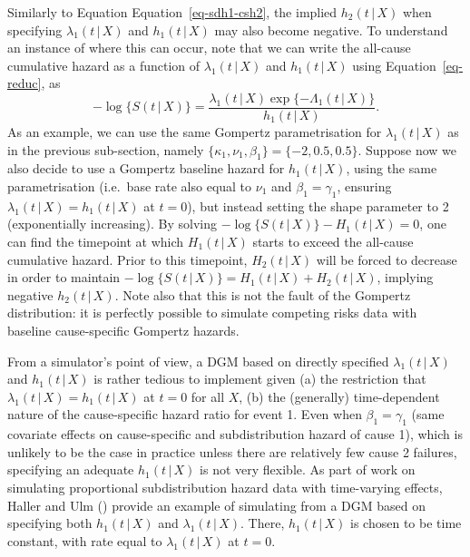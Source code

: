 \documentclass[
  letterpaper,
  paper=240mm:170mm,
  twoside=true,
  open=right,
  fontsize=10pt,
  pagesize=false,
  BCOR=15mm,
  DIV=14,
  headinclude=true,
  footinclude=false,
  headsepline=on]{scrbook}
\newcommand{\given}{\,|\,}
\begin{document}
Similarly to Equation Equation~\ref{eq-sdh1-csh2}, the implied
\(h_2(t \given X)\) when specifying \(\lambda_1(t \given X)\) and
\(h_1(t \given X)\) may also become negative. To understand an instance
of where this can occur, note that we can write the all-cause cumulative
hazard as a function of \(\lambda_1(t \given X)\) and
\(h_1(t \given X)\) using Equation~\ref{eq-reduc}, as \begin{equation*}
    -\log\{S(t \given X)\} = \frac{\lambda_1(t \given X) \exp\{-\Lambda_1(t \given X)\}}{h_1(t \given X)}.
\end{equation*} As an example, we can use the same Gompertz
parametrisation for \(\lambda_1(t \given X)\) as in the previous
sub-section, namely \(\{\kappa_1, \nu_1, \beta_1\} = \{-2, 0.5, 0.5\}\).
Suppose now we also decide to use a Gompertz baseline hazard for
\(h_1(t \given X)\), using the same parametrisation (i.e.~base rate also
equal to \(\nu_1\) and \(\beta_1 = \gamma_1\), ensuring
\(\lambda_1(t \given X) = h_1(t \given X)\) at \(t = 0\)), but instead
setting the shape parameter to 2 (exponentially increasing). By solving
\(-\log\{S(t \given X)\} - H_1(t \given X) = 0\), one can find the
timepoint at which \(H_1(t \given X)\) starts to exceed the all-cause
cumulative hazard. Prior to this timepoint, \(H_2(t \given X)\) will be
forced to decrease in order to maintain
\(-\log\{S(t \given X)\} = H_1(t \given X) + H_2(t \given X)\), implying
negative \(h_2(t \given X)\). Note also that this is not the fault of
the Gompertz distribution: it is perfectly possible to simulate
competing risks data with baseline cause-specific Gompertz hazards.

From a simulator's point of view, a DGM based on directly specified
\(\lambda_1(t \given X)\) and \(h_1(t \given X)\) is rather tedious to
implement given (a) the restriction that
\(\lambda_1(t \given X) = h_1(t \given X)\) at \(t = 0\) for all \(X\),
(b) the (generally) time-dependent nature of the cause-specific hazard
ratio for event 1. Even when \(\beta_1 = \gamma_1\) (same covariate
effects on cause-specific and subdistribution hazard of cause 1), which
is unlikely to be the case in practice unless there are relatively few
cause 2 failures, specifying an adequate \(h_1(t \given X)\) is not very
flexible. As part of work on simulating proportional subdistribution
hazard data with time-varying effects, Haller and Ulm
() provide an
example of simulating from a DGM based on specifying both
\(h_1(t \given X)\) and \(\lambda_1(t \given X)\). There,
\(h_1(t \given X)\) is chosen to be time constant, with rate equal to
\(\lambda_1(t \given X)\) at \(t = 0\).
\end{document}
